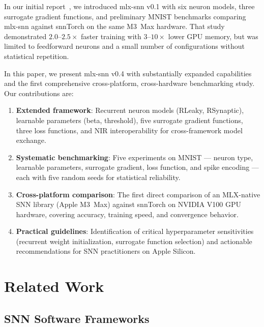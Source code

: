 \documentclass[11pt]{article}
\begin{document}
In our initial report~\citep{qin2026mlxsnn}, we introduced mlx-snn v0.1 with six neuron models, three surrogate gradient functions, and preliminary MNIST benchmarks comparing mlx-snn against snnTorch on the same M3~Max hardware. That study demonstrated $2.0$--$2.5\times$ faster training with $3$--$10\times$ lower GPU memory, but was limited to feedforward neurons and a small number of configurations without statistical repetition.

In this paper, we present mlx-snn v0.4 with substantially expanded capabilities and the first comprehensive cross-platform, cross-hardware benchmarking study. Our contributions are:

\begin{enumerate}[nosep]
    \item \textbf{Extended framework}: Recurrent neuron models (RLeaky, RSynaptic), learnable parameters (beta, threshold), five surrogate gradient functions, three loss functions, and NIR interoperability for cross-framework model exchange.
    \item \textbf{Systematic benchmarking}: Five experiments on MNIST --- neuron type, learnable parameters, surrogate gradient, loss function, and spike encoding --- each with five random seeds for statistical reliability.
    \item \textbf{Cross-platform comparison}: The first direct comparison of an MLX-native SNN library (Apple M3~Max) against snnTorch on NVIDIA V100 GPU hardware, covering accuracy, training speed, and convergence behavior.
    \item \textbf{Practical guidelines}: Identification of critical hyperparameter sensitivities (recurrent weight initialization, surrogate function selection) and actionable recommendations for SNN practitioners on Apple Silicon.
\end{enumerate}

\section{Related Work}

\subsection{SNN Software Frameworks}
\end{document}
